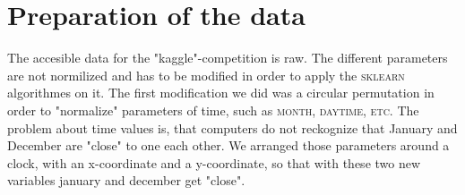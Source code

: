 \documentclass[12pt,oneside,a4paper]{article}
\begin{document}


\section{Preparation of the data}
The accesible data for the "kaggle"-competition is raw. The different parameters
are not normilized and has to be modified in order to apply the \textsc{sklearn}
algorithmes on it. The first modification we did was a circular permutation in
order to "normalize" parameters of time, such as \textsc{month, daytime, etc}.
The problem about time values is, that computers do not reckognize that January
and December are "close" to one each other. We arranged those parameters around
a clock, with an x-coordinate and a y-coordinate, so that with these two new
variables january and december get "close".
\end{document}
